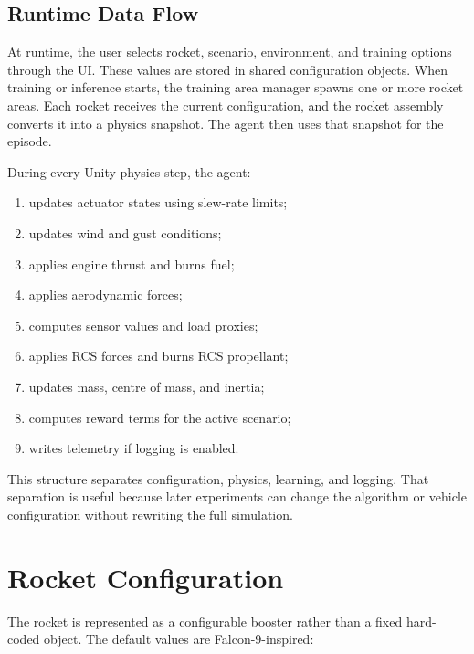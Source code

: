 \documentclass[12pt,a4paper]{article}
\begin{document}
\subsection{Runtime Data Flow}

At runtime, the user selects rocket, scenario, environment, and training options through the UI. These values are stored in shared configuration objects. When training or inference starts, the training area manager spawns one or more rocket areas. Each rocket receives the current configuration, and the rocket assembly converts it into a physics snapshot. The agent then uses that snapshot for the episode.

During every Unity physics step, the agent:

\begin{enumerate}
    \item updates actuator states using slew-rate limits;
    \item updates wind and gust conditions;
    \item applies engine thrust and burns fuel;
    \item applies aerodynamic forces;
    \item computes sensor values and load proxies;
    \item applies RCS forces and burns RCS propellant;
    \item updates mass, centre of mass, and inertia;
    \item computes reward terms for the active scenario;
    \item writes telemetry if logging is enabled.
\end{enumerate}

This structure separates configuration, physics, learning, and logging. That separation is useful because later experiments can change the algorithm or vehicle configuration without rewriting the full simulation.

\section{Rocket Configuration}

The rocket is represented as a configurable booster rather than a fixed hard-coded object. The default values are Falcon-9-inspired:
\end{document}
